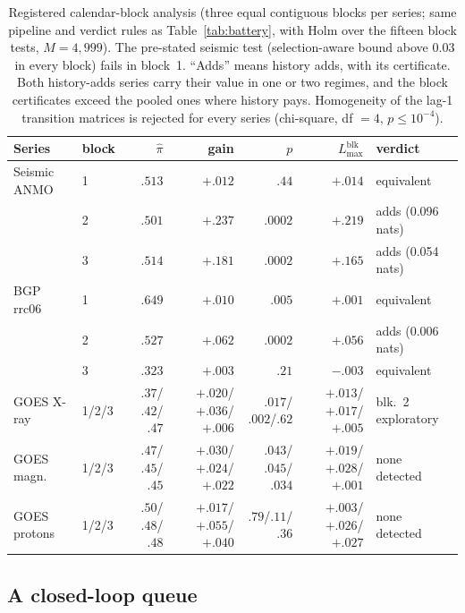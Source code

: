 \documentclass[acmsmall,screen,review,anonymous]{acmart}
\begin{document}
\begin{table}[h]\centering\footnotesize
\setlength{\tabcolsep}{3pt}
\begin{tabular}{llrrrrl}
\toprule
Series & block & $\hat\pi$ & gain & $p$ & $L^{\mathrm{blk}}_{\max}$ & verdict \\
\midrule
Seismic ANMO & 1 & $.513$ & $+.012$ & $.44$ & $+.014$ & equivalent \\
 & 2 & $.501$ & $+.237$ & $.0002$ & $\mathbf{+.219}$ & adds (0.096 nats) \\
 & 3 & $.514$ & $+.181$ & $.0002$ & $\mathbf{+.165}$ & adds (0.054 nats) \\
BGP rrc06 & 1 & $.649$ & $+.010$ & $.005$ & $+.001$ & equivalent \\
 & 2 & $.527$ & $+.062$ & $.0002$ & $+.056$ & adds (0.006 nats) \\
 & 3 & $.323$ & $+.003$ & $.21$ & $-.003$ & equivalent \\
GOES X-ray & 1/2/3 & $.37$/$.42$/$.47$ & $+.020$/$+.036$/$+.006$ & $.017$/$.002$/$.62$ & $+.013$/$+.017$/$+.005$ & blk.~2 exploratory \\
GOES magn. & 1/2/3 & $.47$/$.45$/$.45$ & $+.030$/$+.024$/$+.022$ & $.043$/$.045$/$.034$ & $+.019$/$+.028$/$+.001$ & none detected \\
GOES protons & 1/2/3 & $.50$/$.48$/$.48$ & $+.017$/$+.055$/$+.040$ & $.79$/$.11$/$.36$ & $+.003$/$+.026$/$+.027$ & none detected \\
\bottomrule
\end{tabular}
\caption{Registered calendar-block analysis (three equal contiguous blocks
per series; same pipeline and verdict rules as Table~\ref{tab:battery}, with
Holm over the fifteen block tests, $M=4{,}999$). The
pre-stated seismic test (selection-aware bound above $0.03$ in every block)
fails in block~1. ``Adds'' means history adds, with its certificate. Both history-adds series carry their value in one or two
regimes, and the block certificates exceed the pooled ones where history
pays. Homogeneity of the lag-1 transition matrices is rejected for every
series (chi-square, df $=4$, $p\le10^{-4}$).}
\label{tab:regimes}
\end{table}

\subsection{A closed-loop queue}\label{sec:queue}
\end{document}
